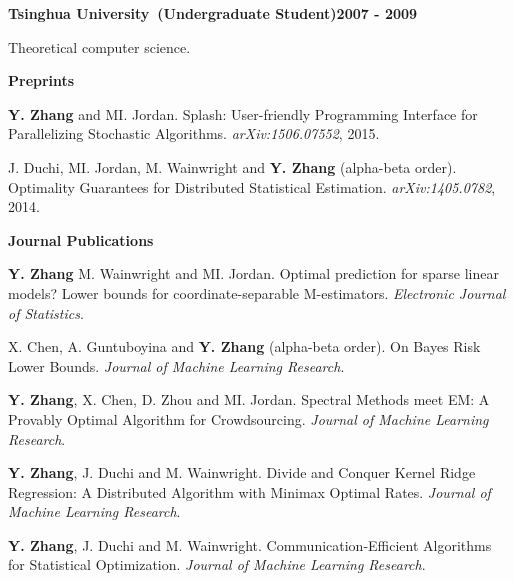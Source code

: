 \documentclass[11pt]{res} %
\newenvironment{my_item}{
\begin{itemize}
  \setlength{\itemsep}{0pt}
  \setlength{\parskip}{0pt}
  \setlength{\parsep}{0pt}}
{\end{itemize}
}
\begin{document}
{\begin{resume}
\vspace{-8pt}
\textbf{Tsinghua University~(Undergraduate Student)\hfill 2007 - 2009}\\
\vspace{-10pt}
\begin{my_item}
	\item Theoretical computer science.
\end{my_item}

{\Large\bf Preprints}
\vspace{5pt}

\begin{enumerate}[ {[P}1{]} ]
\item \textbf{Y. Zhang} and MI. Jordan. Splash: User-friendly Programming Interface for Parallelizing Stochastic Algorithms. \emph{arXiv:1506.07552}, 2015.

\item J. Duchi, MI. Jordan, M. Wainwright and \textbf{Y. Zhang} (alpha-beta order). Optimality Guarantees for Distributed Statistical Estimation. \emph{arXiv:1405.0782}, 2014.
\end{enumerate}

{\Large\bf Journal Publications}
\vspace{5pt}

\begin{enumerate}[ {[J}1{]} ]

\item \textbf{Y. Zhang} M. Wainwright and MI. Jordan. Optimal prediction for sparse linear models? Lower bounds for coordinate-separable M-estimators.
\emph{Electronic Journal of Statistics}.

\item X. Chen, A. Guntuboyina and \textbf{Y. Zhang} (alpha-beta order). On Bayes Risk Lower Bounds.
\emph{Journal of Machine Learning Research}.

\item \textbf{Y. Zhang}, X. Chen, D. Zhou and MI. Jordan. Spectral Methods meet EM: A Provably Optimal Algorithm for Crowdsourcing.
\emph{Journal of Machine Learning Research}.

\item \textbf{Y. Zhang}, J. Duchi and M. Wainwright. Divide and Conquer Kernel Ridge Regression: A Distributed Algorithm with Minimax Optimal Rates.
\emph{Journal of Machine Learning Research}.

\item \textbf{Y. Zhang}, J. Duchi and M. Wainwright. Communication-Efficient Algorithms for Statistical Optimization.
\emph{Journal of Machine Learning Research}.


\end{enumerate}
\end{resume}}
\end{document}
